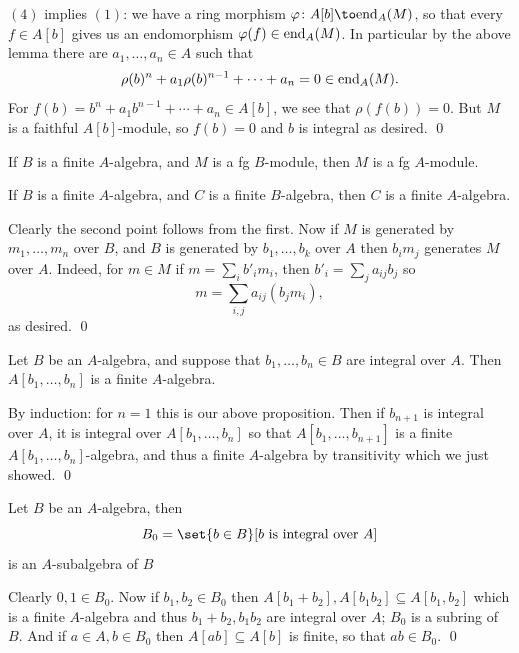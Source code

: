     $(4)$ implies $(1)$: we have a ring morphism $\phi\colon A[b]\to\endo_A(M)$, so that every $f\in A[b]$ gives us an endomorphism
    $\varphi(f)\in{\rm end}_A(M)$.
    In particular by the above lemma there are $a_1,\dots,a_n\in A$ such that
    $$ \rho(b)^n + a_1\rho(b)^{n-1} + \cdots + a_n = 0 \in {\rm end}_A(M) . $$
    For $f(b)=b^n+a_1b^{n-1}+\cdots+a_n\in A[b]$, we see that $\rho(f(b))=0$.
    But $M$ is a faithful $A[b]$-module, so $f(b)=0$ and $b$ is integral as desired.
    \qed

\eproof

\blemm

    \benum
        \item If $B$ is a finite $A$-algebra, and $M$ is a fg $B$-module, then $M$ is a fg $A$-module.
        \item If $B$ is a finite $A$-algebra, and $C$ is a finite $B$-algebra, then $C$ is a finite $A$-algebra.
    \eenum

\elemm

\bproof

    Clearly the second point follows from the first.
    Now if $M$ is generated by $m_1,\dots,m_n$ over $B$, and $B$ is generated by $b_1,\dots,b_k$ over $A$ then $b_im_j$ generates $M$ over $A$.
    Indeed, for $m\in M$ if $m=\sum_ib'_im_i$, then $b'_i=\sum_ja_{ij}b_j$ so
    $$ m = \sum_{i,j}a_{ij}(b_jm_i) , $$
    as desired.
    \qed

\eproof

\bcoro

    Let $B$ be an $A$-algebra, and suppose that $b_1,\dots,b_n\in B$ are integral over $A$.
    Then $A[b_1,\dots,b_n]$ is a finite $A$-algebra.

\ecoro

\bproof

    By induction: for $n=1$ this is our above proposition.
    Then if $b_{n+1}$ is integral over $A$, it is integral over $A[b_1,\dots,b_n]$ so that $A[b_1,\dots,b_{n+1}]$ is a finite $A[b_1,\dots,b_n]$-algebra, and thus a finite $A$-algebra
    by transitivity which we just showed.
    \qed

\eproof

\bcoro

    Let $B$ be an $A$-algebra, then
    $$ B_0 = \set{b\in B}[\hbox{$b$ is integral over $A$}] $$
    is an $A$-subalgebra of $B$

\ecoro

\bproof

    Clearly $0,1\in B_0$.
    Now if $b_1,b_2\in B_0$ then $A[b_1+b_2],A[b_1b_2]\subseteq A[b_1,b_2]$ which is a finite $A$-algebra and thus $b_1+b_2,b_1b_2$ are integral over $A$; $B_0$ is a subring of $B$.
    And if $a\in A,b\in B_0$ then $A[ab]\subseteq A[b]$ is finite, so that $ab\in B_0$.
    \qed


